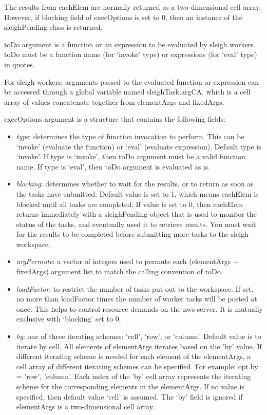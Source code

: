 \begin{list}{}{}
	  The results from eachElem are normally returned as a two-dimensional cell array. 
	  However, if blocking field of execOptions is set to 0, then an instance of the sleighPending class is returned.

	  toDo argument is a function or an expression to be evaluated by sleigh workers. toDo must be a function name (for `invoke'
	  type) or expressions (for `eval' type) in quotes.
    
	  For sleigh workers, arguments passed to the evaluated function or expression can be accessed through a global variable named sleighTask.argCA, 
          which is a cell array of values concatenate together from elementArgs and fixedArgs.

	  execOptions argument is a structure that contains the following fields:
	\begin{itemize}
		\item \textit {type}: determines the type of function invocation to perform. This can be `invoke' (evaluate the function) or 
		`eval' (evaluate expression). Default type is `invoke'. If type is `invoke', then toDo argument must be a valid function name.
		If type is `eval', then toDo argument is evaluated as is. 
    
		\item \textit {blocking}: determines whether to wait for the results, or to return as soon as the tasks have submitted. 
		Default value is set to 1, which means eachElem is blocked until all tasks are completed. If value is set to 0,
		then eachElem returns immediately with a sleighPending object that is used to monitor the status of the tasks,
		and eventually used it to retrieve results. You must wait for the results to be completed before submitting
		more tasks to the sleigh workspace.
	
		\item \textit {argPermute}: a vector of integers used to permute each (elementArgs + fixedArgs) argument list to match 
		the calling convention of toDo.
    
		\item \textit {loadFactor}: to restrict the number of tasks put out to the workspace.
		If set, no more than loadFactor times the number of worker tasks will be posted at once.
                This helps to control resource demands on the nws server. It is mutually exclusive with
                `blocking' set to 0.

		\item \textit {by}:  one of three iterating schemes: `cell', `row', or
		  `column'. Default value is to iterate by cell. All elements of
		  elementArgs iterates based on the 'by' value. If different
		  iterating scheme is needed for each element of the
		  elementArgs, a cell array of different iterating schemes can
		  be specified. For example: opt.by = {'row', 'column'}.
		  Each index of the 'by' cell array represents the iterating
		  scheme for the corresponding elements in the elementArgs. 
		  If no value is specified, then default value `cell' is assumed. 
		  The `by' field is ignored if elementArgs is a two-dimensional cell array.


\end{itemize}
\end{list}
